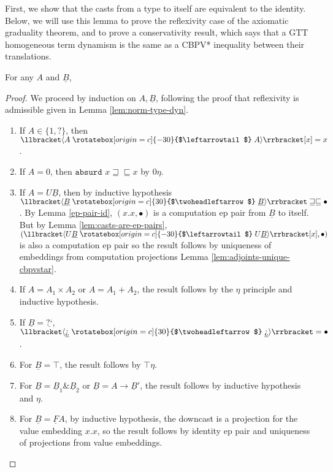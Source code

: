\documentclass[acmsmall,nonacm]{acmart}
\renewcommand{\u}{\underline}
\newcommand{\cbpvstar}{CBPV*}
\newcommand{\sem}[1]{\llbracket#1\rrbracket}
\newcommand{\sdncast}[2]{\sem{\dncast{#1}{#2}}}
\newcommand{\supcast}[2]{\sem{\upcast{#1}{#2}}}
\newcommand{\ltdyn}{\sqsubseteq}
\newcommand{\gtdyn}{\sqsupseteq}
\newcommand{\equidyn}{\mathrel{\gtdyn\ltdyn}}
\newcommand{\dynv}{{?}}
\newcommand{\dync}{\u {\text{?`}}}
\newcommand{\uarrow}{\mathrel{\rotatebox[origin=c]{-30}{$\leftarrowtail$}}}
\newcommand{\darrow}{\mathrel{\rotatebox[origin=c]{30}{$\twoheadleftarrow$}}}
\newcommand{\upcast}[2]{\langle{#2}\uarrow{#1}\rangle}
\newcommand{\dncast}[2]{\langle{#1}\darrow{#2}\rangle}
\newcommand{\kw}[1]{\texttt{#1}\,\,}
\newcommand{\absurd}{\kw{absurd}}
\newcommand{\with}{\mathbin{\&}}
\begin{document}
\begin{longonly}
First, we show that the casts from a type to itself are equivalent to
the identity.
%
Below, we will use this lemma to prove the reflexivity case of the
axiomatic graduality theorem, and to prove a conservativity result,
which says that a GTT homogeneous term dynamism is the same as a
\cbpvstar\/ inequality between their translations.
\begin{lemma}
  \label{lem:ident-expansion}
  For any $A$ and $\u B$,
\end{lemma}
\begin{proof}
  We proceed by induction on $A, \u B$, following the proof that
  reflexivity is admissible given in Lemma \ref{lem:norm-type-dyn}.
  \begin{enumerate}
  \item If $A \in \{1, \dynv \}$, then $\supcast{A}{A}[x] = x$.
  \item If $A = 0$, then $\absurd x \equidyn x$ by $0\eta$.
  \item If $A = U \u B$, then by inductive hypothesis $\sdncast{\u
    B}{\u B} \equidyn \bullet$. By Lemma \ref{ep-pair-id},
    $(x. x, \bullet)$ is a computation ep pair from $\u B$ to
    itself. But by Lemma \ref{lem:casts-are-ep-pairs}, $(\supcast{U\u
      B}{U\u B}[x], \bullet)$ is also a computation ep pair so the
    result follows by uniqueness of embeddings from computation
    projections Lemma \ref{lem:adjoints-unique-cbpvstar}.
  \item If $A = A_1\times A_2$ or $A = A_1+A_2$, the result follows by
    the $\eta$ principle and inductive hypothesis.
  \item If $\u B = \dync$, $\sdncast{\dync}{\dync} = \bullet$.
  \item For $\u B = \top$, the result follows by $\top\eta$.
  \item For $\u B = \u B_1 \with \u B_2$ or $\u B = A \to \u B'$, the
    result follows by inductive hypothesis and $\eta$.
  \item For $\u B = \u FA$, by inductive hypothesis, the downcast is a
    projection for the value embedding $x.x$, so the result follows by
    identity ep pair and uniqueness of projections from value
    embeddings.
  \end{enumerate}
\end{proof}


\end{longonly}
\end{document}
